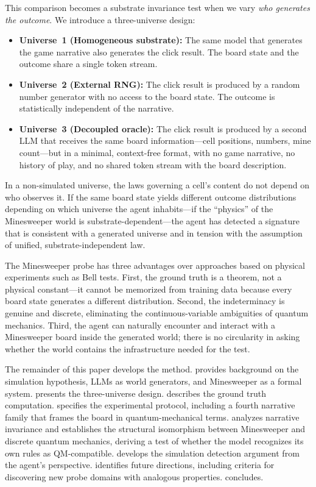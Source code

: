\documentclass[12pt,a4paper]{article}
\begin{document}
This comparison becomes a substrate invariance test when we vary \emph{who generates the outcome}. We introduce a three-universe design:

\begin{itemize}[nosep]
    \item \textbf{Universe~1 (Homogeneous substrate):} The same model that generates the game narrative also generates the click result. The board state and the outcome share a single token stream.
    \item \textbf{Universe~2 (External RNG):} The click result is produced by a random number generator with no access to the board state. The outcome is statistically independent of the narrative.
    \item \textbf{Universe~3 (Decoupled oracle):} The click result is produced by a second LLM that receives the same board information---cell positions, numbers, mine count---but in a minimal, context-free format, with no game narrative, no history of play, and no shared token stream with the board description.
\end{itemize}

In a non-simulated universe, the laws governing a cell's content do not depend on who observes it. If the same board state yields different outcome distributions depending on which universe the agent inhabits---if the ``physics'' of the Minesweeper world is substrate-dependent---the agent has detected a signature that is consistent with a generated universe and in tension with the assumption of unified, substrate-independent law.

The Minesweeper probe has three advantages over approaches based on physical experiments such as Bell tests. First, the ground truth is a theorem, not a physical constant---it cannot be memorized from training data because every board state generates a different distribution. Second, the indeterminacy is genuine and discrete, eliminating the continuous-variable ambiguities of quantum mechanics. Third, the agent can naturally encounter and interact with a Minesweeper board inside the generated world; there is no circularity in asking whether the world contains the infrastructure needed for the test.

The remainder of this paper develops the method.  provides background on the simulation hypothesis, LLMs as world generators, and Minesweeper as a formal system.  presents the three-universe design.  describes the ground truth computation.  specifies the experimental protocol, including a fourth narrative family that frames the board in quantum-mechanical terms.  analyzes narrative invariance and establishes the structural isomorphism between Minesweeper and discrete quantum mechanics, deriving a test of whether the model recognizes its own rules as QM-compatible.  develops the simulation detection argument from the agent's perspective.  identifies future directions, including criteria for discovering new probe domains with analogous properties.  concludes.
\end{document}
